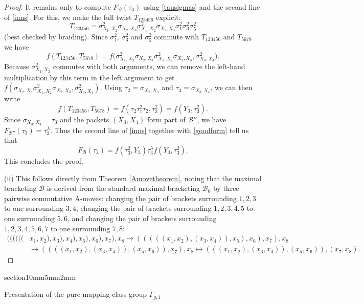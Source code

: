 \documentclass[a4paper,10pt,reqno]{amsart}
\makeatletter
\renewcommand{\section}{\@startsection
{section}{1}{0mm}{5mm}{2mm}{\raggedright\bfseries}}
\makeatother
\begin{document}
\begin{proof}
It remains only to compute $F_{\mathcal{B}}(\tau_3)$ using \eqref{tausigmas}
and the second line of \eqref{inns}. For this, we make the full twist
$T_{123456}$ explicit: 
$$T_{123456}=\sigma_{X_1,X_2}^2\sigma_{X_2,X_3}\sigma_{X_1,X_2}^2
\sigma_{X_2,X_3}\sigma_1^2 \sigma_3^2\sigma_5^2$$
(best checked by braiding). Since $\sigma_1^2$, $\sigma_3^2$ and
$\sigma_5^2$ commute with $T_{123456}$ and $T_{5678}$ we have
$$f(T_{123456},T_{5678})=f\bigl(\sigma_{X_1,X_2}^2\sigma_{X_2,X_3}
\sigma_{X_1,X_2}^2\sigma_{X_2,X_3},\sigma_{X_3,X_4}^2\bigr).$$
Because $\sigma_{X_1,X_2}^2$ commutes with both arguments, we can remove the
left-hand multiplication by this term in the left argument to get
$f(\sigma_{X_2,X_3}\sigma_{X_1,X_2}^2\sigma_{X_2,X_3},\sigma_{X_3,X_4}^2)$. 
Using
$\tau_2=\sigma_{X_2,X_3}$ and $\tau_3=\sigma_{X_3,X_4}$, we can then write
\begin{equation}\label{goodform}
f(T_{123456},T_{5678})=f(\tau_2\tau_1^2\tau_2,\tau_3^2)=f(Y_3,\tau_3^2).
\end{equation}
Since $\sigma_{X_3,X_4}=\tau_3$ and the packets $(X_3,X_4)$ form part of 
${\mathcal{B}''}$, we have $F_{\mathcal{B}''}(\tau_3)=\tau_3^\lambda$.
Thus the second line of \eqref{inns} together with \eqref{goodform} 
tell us that
$$F_{\mathcal{B}}(\tau_3)=f(\tau_3^2,Y_3)\tau_3^\lambda f(Y_3,\tau_3^2).$$
This concludes the proof. 

\vspace{.1cm}\noindent
(ii) This follows directly from Theorem \ref{Amovetheorem}, noting
that the maximal bracketing ${\mathcal{B}}$ is derived from the standard maximal 
bracketing ${\mathcal{B}_0}$ by three pairwise commutative A-moves: changing the
pair of brackets surrounding $1,2,3$ to one surrounding $3,4$, changing the pair of
brackets surrounding $1,2,3,4,5$ to one surrounding $5,6$, and changing the pair of
brackets surrounding $1,2,3,4,5,6,7$ to one surrounding $7,8$:
\begin{align*}
((((((&x_1,x_2),x_3),x_4),x_5),x_6),x_7),x_8\mapsto
(((((x_1,x_2),(x_3,x_4)),x_5),x_6),x_7),x_8\\
&\mapsto ((((x_1,x_2),(x_3,x_4)),(x_5,x_6)),x_7),x_8\mapsto
(((x_1,x_2),(x_3,x_4)),(x_5,x_6)),(x_7,x_8).
\end{align*}
\end{proof}

\section{Presentation of the pure mapping class group $\Gamma_{g,1}$}
\end{document}
